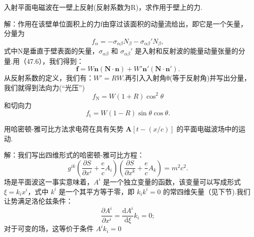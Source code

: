 \begin{xiti}

\quad 入射平面电磁波在一壁上反射(反射系数为R)，求作用于壁上的力.

解：作用在该壁单位面积上的力f由穿过该面积的动量流给出，即它是一个矢量，分量为
\begin{equation*}
  f_\alpha=-\sigma_{\alpha\beta}N_\beta-\sigma_{\alpha\beta}'N_\beta,
\end{equation*}
式中N是垂直于壁表面的矢量，$\sigma_{\alpha\beta}$ 和 $\sigma_{\alpha\beta}'$ 是入射和反射波的能量动量张量的分量.用（47.6），我们得到：
\begin{equation*}
  \boldsymbol{f}=W\boldsymbol{n}(\boldsymbol{N}\cdot\boldsymbol{n})
  +W'\boldsymbol{n}'(\boldsymbol{N}\cdot\boldsymbol{n}').
\end{equation*}
从反射系数的定义，我们有：$W' = RW$.再引入入射角θ(等于反射角)并写出分量，我们就得到法向力(“光压”)
\begin{equation*}
  f_{\mathrm{N}}=W(1+R)\cos^2\theta
\end{equation*}
和切向力
\begin{equation*}
  f_{\mathrm{t}}=W(1-R)\sin\theta\cos\theta.
\end{equation*}

\quad 用哈密顿-雅可比方法求电荷在具有矢势 $\boldsymbol{A}[t - (x/c)]$ 的平面电磁波场中的运动.

解：我们写出四维形式的哈密顿-雅可比方程：
\begin{equation}\tag{1}
  g^{ik}\left(\frac{\partial S}{\partial x^i}+\frac{e}{c}A_i\right)
  \left(\frac{\partial S}{\partial x^k}+\frac{e}{c}A_k\right)=m^2c^2.
\end{equation}
场是平面波这一事实意味着，$A^i$ 是一个独立变量的函数，该变量可以写成形式 $\xi = k_ix^i$，式中 $k^i$ 是一个其平方等于零，即 $k_ik^i = 0$ 的常四维矢量（见下节).我们让势满足洛伦兹条件：
\begin{equation*}
  \frac{\partial A^i}{\partial x^i}=\frac{\mathrm{d}A^i}{\mathrm{d}\xi}k_i=0;
\end{equation*}
对于可变的场，这等价于条件 $A^ik_i = 0$


\end{xiti}
